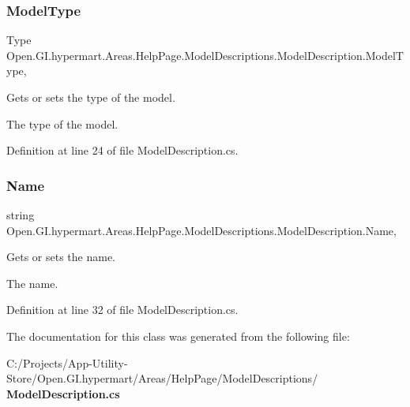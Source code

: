 \subsubsection{Model\+Type}
{\footnotesize\ttfamily Type Open.\+G\+I.\+hypermart.\+Areas.\+Help\+Page.\+Model\+Descriptions.\+Model\+Description.\+Model\+Type\hspace{0.3cm}{\ttfamily [get]}, {\ttfamily [set]}}



Gets or sets the type of the model. 

The type of the model. 

Definition at line 24 of file Model\+Description.\+cs.

\mbox{\label{class_open_1_1_g_i_1_1hypermart_1_1_areas_1_1_help_page_1_1_model_descriptions_1_1_model_description_aa5a42ec74b1d880ce15fd12b8ef0baf9}} 
\subsubsection{Name}
{\footnotesize\ttfamily string Open.\+G\+I.\+hypermart.\+Areas.\+Help\+Page.\+Model\+Descriptions.\+Model\+Description.\+Name\hspace{0.3cm}{\ttfamily [get]}, {\ttfamily [set]}}



Gets or sets the name. 

The name. 

Definition at line 32 of file Model\+Description.\+cs.



The documentation for this class was generated from the following file\+:\begin{DoxyCompactItemize}
\item 
C\+:/\+Projects/\+App-\/\+Utility-\/\+Store/\+Open.\+G\+I.\+hypermart/\+Areas/\+Help\+Page/\+Model\+Descriptions/\textbf{ Model\+Description.\+cs}\end{DoxyCompactItemize}
